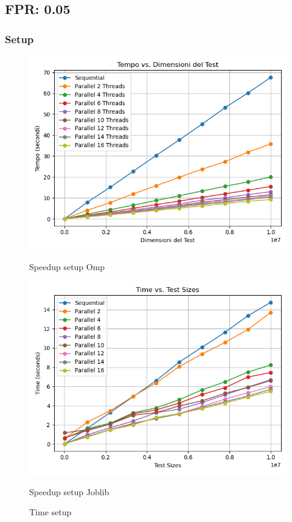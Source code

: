 \documentclass[11pt]{article}
\begin{document}
    \subsection{FPR: 0.05}\label{subsec:fpr-005}
    \subsubsection{Setup}\label{subsubsec:fpr-005-setup}
    \begin{figure}[H]
        \centering
        \includegraphics[width=\linewidth]{omp/005/setup_time_plot}
            \caption{Speedup setup Omp}\label{fig:005-setup_time_omp}
        \endminipage\hfill
        \includegraphics[width=\linewidth]{joblib/005/setup_time_plot}
            \caption{Speedup setup Joblib}\label{fig:005-setup_time_joblib}
        \endminipage\hfill
        \caption{Time setup}
    \end{figure}
\end{document}
